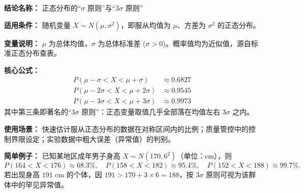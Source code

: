 \textbf{结论名称：} 正态分布的“$\sigma$ 原则”与“$3\sigma$ 原则”

\textbf{适用条件：} 随机变量 $X\sim N(\mu,\sigma^{2})$，即服从均值为 $\mu$、方差为 $\sigma^{2}$ 的正态分布。

\textbf{变量说明：} $\mu$ 为总体均值，$\sigma$ 为总体标准差 ($\sigma>0$)。概率值均为近似值，源自标准正态分布查表。

\textbf{核心公式：}
\[
\boxed{
\begin{aligned}
P(\mu-\sigma<X<\mu+\sigma) &\approx 0.6827 \\
P(\mu-2\sigma<X<\mu+2\sigma) &\approx 0.9545 \\
P(\mu-3\sigma<X<\mu+3\sigma) &\approx 0.9973
\end{aligned}
}
\]
其中第三条即著名的“$3\sigma$ 原则”：正态变量取值几乎全部落在均值左右 $3\sigma$ 之内。

\textbf{使用场景：} 快速估计服从正态分布的数据在对称区间内的比例；质量管控中的控制界限设定；实验数据中粗大误差（异常值）的判别。

\textbf{简单例子：} 已知某地区成年男子身高 $X\sim N(170,6^{2})$（单位：cm），则
\[
P(164<X<176)\approx 68.3\%,\quad 
P(158<X<182)\approx 95.4\%,\quad 
P(152<X<188)\approx 99.7\%.
\]
若出现身高 $191$ cm 的个体，因 $191>170+3\times6=188$，按 $3\sigma$ 原则可视为该群体中的罕见异常值。
